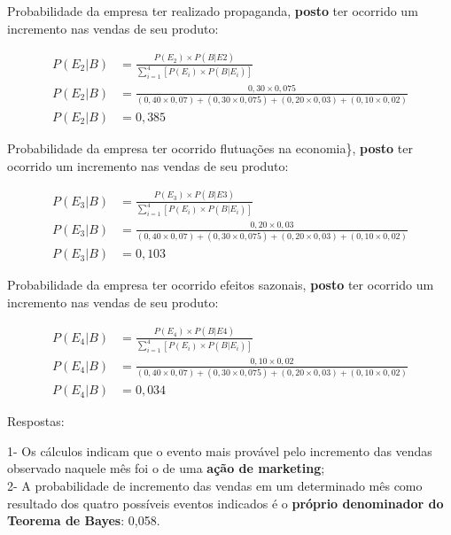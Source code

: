 \documentclass[
]{book}
\begin{document}
Probabilidade da empresa ter realizado propaganda, \textbf{posto} ter ocorrido um incremento nas vendas de seu produto:

\hfill\break

\begin{align*}
P(E_{2}|B) &  = \frac{ P(E_{2}) \times P(B|E{2})   }{  \sum _{i=1}^{4}\left[P\left({E}_{i}\right)\times P\left(B|{E}_{i}\right)\right]  }  \\
P(E_{2}|B) & = \frac{0,30 \times 0,075} { (0,40 \times 0,07) + (0,30 \times 0,075) +(0,20 \times 0,03) +(0,10 \times 0,02) } \\
P(E_{2}|B) & = 0,385 
\end{align*}

\hfill\break

Probabilidade da empresa ter ocorrido flutuações na economia\}, \textbf{posto} ter ocorrido um incremento nas vendas de seu produto:

\hfill\break

\begin{align*}
P(E_{3}|B) & = \frac{ P(E_{3}) \times P(B|E{3})   }{  \sum _{i=1}^{4}\left[P\left({E}_{i}\right)\times P\left(B|{E}_{i}\right)\right]  } \\
P(E_{3}|B) & = \frac{0,20 \times 0,03} { (0,40 \times 0,07) + (0,30 \times 0,075) +(0,20 \times 0,03) +(0,10 \times 0,02) } \\
P(E_{3}|B) & = 0,103 
\end{align*}

\hfill\break

Probabilidade da empresa ter ocorrido efeitos sazonais, \textbf{posto} ter ocorrido um incremento nas vendas de seu produto:

\hfill\break
\begin{align*}
P(E_{4}|B) & = \frac{ P(E_{4}) \times P(B|E{4})   }{  \sum _{i=1}^{4}\left[P\left({E}_{i}\right)\times P\left(B|{E}_{i}\right)\right]  } \\
P(E_{4}|B) & = \frac{0,10 \times 0,02} { (0,40 \times 0,07) + (0,30 \times 0,075) +(0,20 \times 0,03) +(0,10 \times 0,02) } \\
P(E_{4}|B) & = 0,034 
\end{align*}

\hfill\break

Respostas:

\hfill\break

1- Os cálculos indicam que o evento mais provável pelo incremento das vendas observado naquele mês foi o de uma \textbf{ação de marketing};\\
2- A probabilidade de incremento das vendas em um determinado mês como resultado dos quatro possíveis eventos indicados é o \textbf{próprio denominador do Teorema de Bayes}: 0,058.
\end{document}
